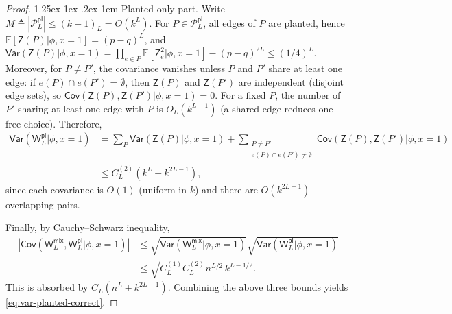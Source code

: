 \documentclass[12pt]{article}
\makeatletter
\newcommand{\bE}{\mathbb{E}}
\newcommand{\p}[1]{\left(#1\right)}
\newcommand{\s}[1]{\mathsf{#1}}
\renewcommand{\paragraph}{%
  \@startsection{paragraph}{4}%
  {\z@}{1.25ex \@plus 1ex \@minus .2ex}{-1em}%
  {\normalfont\normalsize\bfseries}%
}
\makeatother
\begin{document}
\begin{proof}
\paragraph{Planted-only part.} Write $M\triangleq |\mathcal P_L^{\s{pl}}|\leq (k-1)_{L}=O(k^L)$.
For $P\in\mathcal P_L^{\s{pl}}$, all edges of $P$ are planted, hence $\bE[\s{Z}(P)\vert\phi,x=1]=(p-q)^L$, and $\s{Var}(\s{Z}(P)\vert \phi,x=1)=\prod_{e\in P}\bE[\s{Z}_e^2\vert \phi,x=1]-(p-q)^{2L}\le (1/4)^L$. Moreover, for $P\neq P'$, the covariance vanishes unless $P$ and $P'$ share at least one edge: if $e(P)\cap e(P')=\emptyset$, then $\s{Z}(P)$ and $\s{Z}(P')$ are independent (disjoint edge sets), so $\s{Cov}(\s{Z}(P),\s{Z}(P')\vert \phi,x=1)=0$. For a fixed $P$, the number of $P'$ sharing at least one edge with $P$ is $O_L(k^{L-1})$ (a shared edge reduces one free choice). Therefore,
\begin{align}
\s{Var}(\s{W}_L^{\s{pl}}\vert \phi,x=1)
&=\sum_{P}\s{Var}(\s{Z}(P)\vert \phi,x=1)+\sum_{\substack{P\neq P'\\ e(P)\cap e(P')\neq\emptyset}}\s{Cov}(\s{Z}(P),\s{Z}(P')\vert\phi,x=1)\\
&\leq C_L^{(2)}\p{k^L + k^{2L-1}},
\end{align}
since each covariance is $O(1)$ (uniform in $k$) and there are $O(k^{2L-1})$ overlapping pairs.

Finally, by Cauchy--Schwarz inequality,
\begin{align}
|\s{Cov}(\s{W}_L^{\s{mix}},\s{W}_L^{\s{pl}}\vert\phi,x=1)|
&\leq\sqrt{\s{Var}(\s{W}_L^{\s{mix}}\vert\phi,x=1)}\sqrt{\s{Var}(\s{W}_L^{\s{pl}}\vert\phi,x=1)}\\
&\leq\sqrt{C_L^{(1)}C_L^{(2)}}n^{L/2}\,k^{L-1/2}.
\end{align}
This is absorbed by $C_L(n^L+k^{2L-1})$. Combining the above three bounds yields \eqref{eq:var-planted-correct}.
\end{proof}
\end{document}

